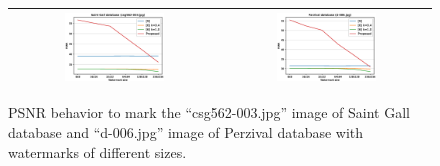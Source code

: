 \documentclass[runningheads]{llncs}
\begin{document}
\begin{figure}
	\begin{center}
		\begin{tabular}{|c|c|}\hline
			\includegraphics[width=0.5\textwidth]{PSNRwsizeSaintGall.eps}
			&\includegraphics[width=0.5\textwidth]{PSNRwsizeParzival.eps}\\\hline
		\end{tabular}
	\end{center}
	\caption{PSNR behavior to mark the ``csg562-003.jpg'' image of Saint Gall database and ``d-006.jpg'' image of Perzival database with watermarks of different sizes.}
	\label{psnrwsize}
\end{figure}
\end{document}
